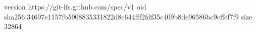 version https://git-lfs.github.com/spec/v1
oid sha256:34697e1157fb5908835331822d8c644fff2fdf35c409b8de96586bc9cffef7f9
size 32864
